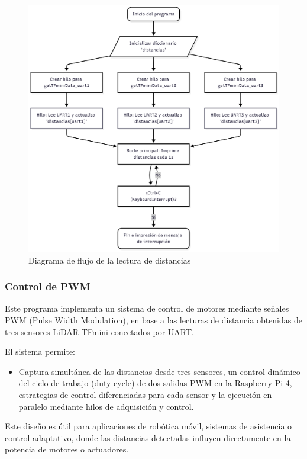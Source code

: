 \documentclass[12pt,a4paper]{article}
\begin{document}
\begin{figure}[H]
\noindent\hspace*{-0.7in}%
\includegraphics[width=1.2\linewidth,height=1.1\linewidth]{Carpeta tecnica/diagrama de flujo TFmini3.png}
\caption{Diagrama de flujo de la lectura de distancias}
\end{figure}

\subsubsection{Control de PWM}
Este programa implementa un sistema de control de motores mediante señales PWM (Pulse Width Modulation), en base a las lecturas de distancia obtenidas de tres sensores LiDAR TFmini conectados por UART.

El sistema permite:
\begin{itemize}
\item Captura simultánea de las distancias desde tres sensores, un control dinámico del ciclo de trabajo (duty cycle) de dos salidas PWM en la Raspberry Pi 4, estrategias de control diferenciadas para cada sensor y la ejecución en paralelo mediante hilos de adquisición y control.
\end{itemize}
Este diseño es útil para aplicaciones de robótica móvil, sistemas de asistencia o control adaptativo, donde las distancias detectadas influyen directamente en la potencia de motores o actuadores.
\end{document}
